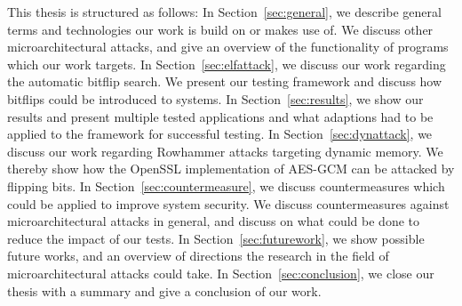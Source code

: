 This thesis is structured as follows:
In Section~\ref{sec:general}, we describe general terms and technologies our
work is build on or makes use of. We discuss other microarchitectural attacks,
and give an overview of the functionality of programs which our work targets.
In Section~\ref{sec:elfattack}, we discuss our work regarding the automatic
bitflip search. We present our testing framework and discuss how bitflips could
be introduced to systems.
In Section~\ref{sec:results}, we show our results and present multiple tested
applications and what adaptions had to be applied to the framework for
successful testing.
In Section~\ref{sec:dynattack}, we discuss our work regarding Rowhammer attacks
targeting dynamic memory. We thereby show how the OpenSSL implementation of
AES-GCM can be attacked by flipping bits.
In Section~\ref{sec:countermeasure}, we discuss countermeasures which could be
applied to improve system security. We discuss countermeasures against
microarchitectural attacks in general, and discuss on what could be done to
reduce the impact of our tests. In Section~\ref{sec:futurework}, we show
possible future works, and an overview of directions the research in the field
of microarchitectural attacks could take.
In Section~\ref{sec:conclusion}, we close our thesis with a summary and give a
conclusion of our work.

